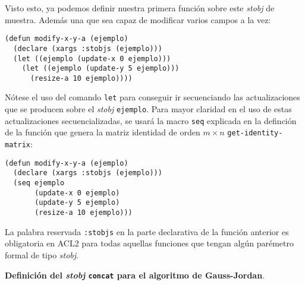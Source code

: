 \documentclass[a4paper,10pt]{article}
\begin{document}
\par \vspace{10pt}

Visto esto, ya podemos definir nuestra primera función sobre este \emph{stobj} de muestra. Además una que sea capaz de modificar varios campos a la vez:

\par \vspace{10pt}

\begin{lstlisting}[language=clips]
(defun modify-x-y-a (ejemplo)
  (declare (xargs :stobjs (ejemplo)))
  (let ((ejemplo (update-x 0 ejemplo)))
    (let ((ejemplo (update-y 5 ejemplo)))
      (resize-a 10 ejemplo))))
\end{lstlisting}

\par \vspace{10pt}

Nótese el uso del comando \texttt{let} para conseguir ir secuenciando las actualizaciones que se producen sobre el \emph{stobj} \texttt{ejemplo}. Para mayor claridad en el uso de estas actualizaciones secuencializadas, se usará la macro \texttt{seq} explicada en la definción de la función que genera la matriz identidad de orden $m \times n$ \texttt{get-identity-matrix}:

\par \vspace{10pt}

\begin{lstlisting}[language=clips]
(defun modify-x-y-a (ejemplo)
  (declare (xargs :stobjs (ejemplo)))
  (seq ejemplo
       (update-x 0 ejemplo) 	
       (update-y 5 ejemplo)
       (resize-a 10 ejemplo)))
\end{lstlisting}

\par \vspace{10pt}

La palabra reservada \texttt{:stobjs} en la parte declarativa de la función anterior es obligatoria en ACL2 para todas aquellas funciones que tengan algún parémetro formal de tipo \emph{stobj}.

\par \vspace{14pt}

\textbf{Definición del \emph{stobj} \texttt{concat} para el algoritmo de Gauss-Jordan}.

\par \vspace{10pt}
\end{document}
